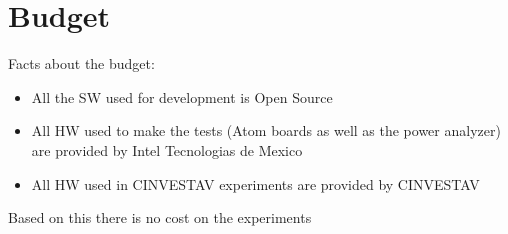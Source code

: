 \section{Budget}
\noindent

Facts about the budget:
\begin{itemize}
    \item All the SW used for development is Open Source
    \item All HW used to make the tests (Atom boards as well as the power
    analyzer) are provided by Intel Tecnologias de Mexico
    \item All HW used in CINVESTAV experiments are provided by CINVESTAV
\end{itemize}

Based on this there is no cost on the experiments

\clearpage
